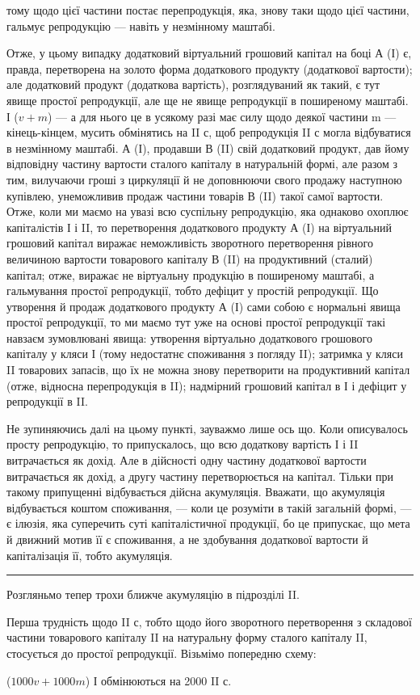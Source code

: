 \parcont{}  %
тому щодо цієї частини постає перепродукція, яка, знову таки щодо цієї
частини, гальмує репродукцію — навіть у незмінному маштабі.

Отже, у цьому випадку додатковий віртуальний грошовий капітал на
боці А (І) є, правда, перетворена на золото форма додаткового продукту
(додаткової вартости); але додатковий продукт (додаткова вартість), розглядуваний
як такий, є тут явище простої репродукції, але ще не явище
репродукції в поширеному маштабі. І ($v + m$) — а для нього це в усякому
разі має силу щодо деякої частини m — кінець-кінцем, мусить обмінятись
на II с, щоб репродукція II с могла відбуватися в незмінному маштабі.
А (І), продавши В (II) свій додатковий продукт, дав йому відповідну
частину вартости сталого капіталу в натуральній формі, але разом з тим,
вилучаючи гроші з циркуляції й не доповнюючи свого продажу наступною
купівлею, унеможливив продаж частини товарів В (II) такої самої
вартости. Отже, коли ми маємо на увазі всю суспільну репродукцію, яка
однаково охоплює капіталістів І і II, то перетворення додаткового продукту
А (І) на віртуальний грошовий капітал виражає неможливість зворотного
перетворення рівного величиною вартости товарового капіталу
В (II) на продуктивний (сталий) капітал; отже, виражає не віртуальну
продукцію в поширеному маштабі, а гальмування простої репродукції,
тобто дефіцит у простій репродукції. Що утворення й продаж додаткового
продукту А (І) сами собою є нормальні явища простої репродукції,
то ми маємо тут уже на основі простої репродукції такі навзаєм зумовлювані
явища: утворення віртуально додаткового грошового капіталу у
кляси І (тому недостатнє споживання з погляду II); затримка у кляси II
товарових запасів, що їх не можна знову перетворити на продуктивний
капітал (отже, відносна перепродукція в II); надмірний грошовий капітал
в І і дефіцит у репродукції в II.

Не зупиняючись далі на цьому пункті, зауважмо лише ось що.
Коли описувалось просту репродукцію, то припускалось, що всю додаткову
вартість І і II витрачається як дохід. Але в дійсності одну частину
додаткової вартости витрачається як дохід, а другу частину перетворюється
на капітал. Тільки при такому припущенні відбувається дійсна
акумуляція. Вважати, що акумуляція відбувається коштом споживання, —
коли це розуміти в такій загальній формі, — є ілюзія, яка суперечить суті
капіталістичної продукції, бо це припускає, що мета й движний мотив
її є споживання, а не здобування додаткової вартости й капіталізація її,
тобто акумуляція.

\pfbreak

Розгляньмо тепер трохи ближче акумуляцію в підрозділі II.

Перша трудність щодо II $с$, тобто щодо його зворотного перетворення
з складової частини товарового капіталу II на натуральну форму
сталого капіталу II, стосується до простої репродукції. Візьмімо попередню
схему:
\begin{center}
  ($1000 v + 1000 m$) І обмінюються на
  2000 II $с$.
\end{center}
